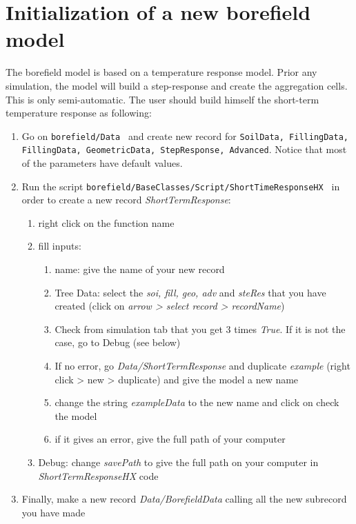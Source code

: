 \documentclass[a4paper,oneside,11pt]{report}
\begin{document}
\section{Initialization of a new borefield model} \label{sec:ini_mod}
The borefield model is based on a temperature response model. Prior any simulation, the model will build a step-response and create the aggregation cells. This is only semi-automatic. The user should build himself the short-term temperature response as following:
\begin{enumerate}
\item Go on {\tt borefield/Data } and create new record for {\tt SoilData, FillingData, FillingData, GeometricData, StepResponse, Advanced}. Notice that most of the parameters have default values.
\item Run the script {\tt borefield/BaseClasses/Script/ShortTimeResponseHX } in order to create a new record \textit{ShortTermResponse}:
	\begin{enumerate}
	\item right click on the function name
	\item fill inputs:
		\begin{enumerate}
		\item name: give the name of your new record
		\item Tree Data: select the \textit{soi, fill, geo, adv} and \textit{steRes} that you have created (click on \textit{arrow > select record > recordName})
		\item Check from simulation tab that you get 3 times \textit{True}. If it is not the case, go to Debug (see below)
		\item If no error, go \textit{Data/ShortTermResponse} and duplicate \textit{example} (right click > new > duplicate) and give the model a new name
		\item change the string \textit{exampleData} to the new name and click on check the model
		\item if it gives an error, give the full path of your computer
		\end{enumerate}
	\item Debug: change \textit{savePath} to give the full path on your computer in \textit{ShortTermResponseHX} code
	\end{enumerate}
\item Finally, make a new record \textit{Data/BorefieldData} calling all the new subrecord you have made
\end{enumerate}
\end{document}

